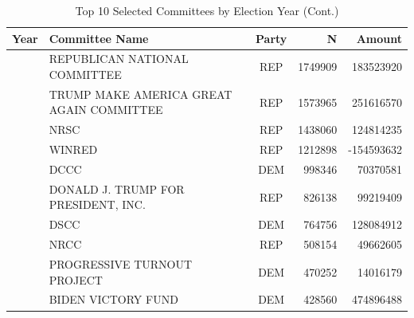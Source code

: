 \begin{table}[tbp] \centering
{}

\ContinuedFloat
\caption[]{Top 10 Selected Committees by Election Year (Cont.)}

\footnotesize
\begin{tabularx}{\linewidth}{c L c r r}

\toprule
{Year}&{Committee Name}&{Party}&{N}&{Amount} \tabularnewline
\midrule {}&REPUBLICAN NATIONAL COMMITTEE&REP&1749909&183523920 \tabularnewline
&TRUMP MAKE AMERICA GREAT AGAIN COMMITTEE&REP&1573965&251616570 \tabularnewline
&NRSC&REP&1438060&124814235 \tabularnewline
&WINRED&REP&1212898&-154593632 \tabularnewline
&DCCC&DEM&998346&70370581 \tabularnewline
&DONALD J. TRUMP FOR PRESIDENT, INC.&REP&826138&99219409 \tabularnewline
&DSCC&DEM&764756&128084912 \tabularnewline
&NRCC&REP&508154&49662605 \tabularnewline
&PROGRESSIVE TURNOUT PROJECT&DEM&470252&14016179 \tabularnewline
&BIDEN VICTORY FUND&DEM&428560&474896488 \tabularnewline
\bottomrule

\end{tabularx}
\end{table}
